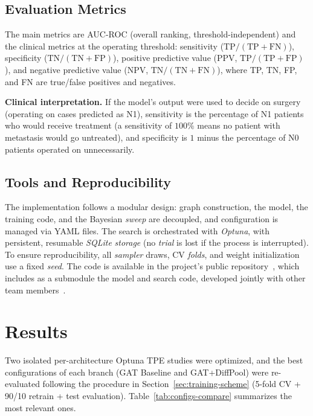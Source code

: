 \documentclass[10pt,a4paper,twocolumn,twoside]{article}
\begin{document}
\subsection{Evaluation Metrics}

The main metrics are AUC-ROC (overall ranking, threshold-independent) and the
clinical metrics at the operating threshold: sensitivity ($\text{TP}/(\text{TP}+\text{FN})$),
specificity ($\text{TN}/(\text{TN}+\text{FP})$), positive predictive value
(PPV, $\text{TP}/(\text{TP}+\text{FP})$), and negative predictive value
(NPV, $\text{TN}/(\text{TN}+\text{FN})$), where TP, TN, FP, and FN are true/false positives and
negatives.

\textbf{Clinical interpretation.} If the model's output were used to decide on surgery (operating on
cases predicted as N1), sensitivity is the percentage of N1 patients who would receive
treatment (a sensitivity of $100\%$ means no patient with metastasis would go
untreated), and specificity is $1$ minus the percentage of N0 patients operated on
unnecessarily.

\subsection{Tools and Reproducibility}

The implementation follows a modular design: graph construction, the model, the training
code, and the Bayesian \textit{sweep} are decoupled, and configuration is managed via
YAML files. The search is orchestrated with \textit{Optuna}, with persistent, resumable
\textit{SQLite} \textit{storage} (no \textit{trial} is lost if the process is interrupted). To ensure
reproducibility, all \textit{sampler} draws, CV \textit{folds}, and weight
initialization use a fixed \textit{seed}. The code is available in the project's public
repository~\cite{morillo2026repo}, which includes as a submodule the model and search code,
developed jointly with other team members~\cite{morillo2026codi}.

\section{Results}

Two isolated per-architecture Optuna TPE studies were optimized, and the best
configurations of each branch (GAT Baseline and GAT+DiffPool) were re-evaluated following the
procedure in Section~\ref{sec:training-scheme} (5-fold CV + 90/10 retrain + test
evaluation). Table~\ref{tab:configs-compare} summarizes the most relevant ones.
\end{document}
